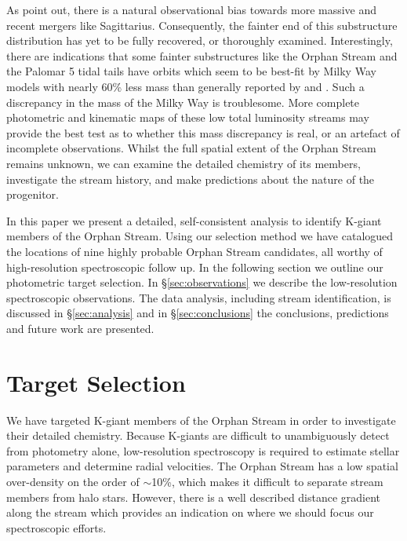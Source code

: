 \documentclass[10pt,apjl]{emulateapj}
\begin{document}
As \citet{Sales_et-al_2008} point out, there is a natural observational bias towards more massive and recent mergers like Sagittarius. Consequently, the fainter end of this substructure distribution has yet to be fully recovered, or thoroughly examined. Interestingly, there are indications that  some fainter substructures like the Orphan Stream and the Palomar 5 tidal tails \citep{Odenkirchen_et-al_2009} have orbits which seem to be best-fit by Milky Way models with nearly 60\% less mass \citep{Newberg_et-al_2010} than generally reported by \citet{Xue_et-al_2008} and \citet{Koposov_et-al_2010}. Such a discrepancy in the mass of the Milky Way is troublesome. More complete photometric and kinematic maps of these low total luminosity streams may provide the best test as to whether this mass discrepancy is real, or an artefact of incomplete observations. Whilst the full spatial extent of the Orphan Stream remains unknown, we can examine the detailed chemistry of its members, investigate the stream history, and make predictions about the nature of the progenitor.

In this paper we present a detailed, self-consistent analysis to identify K-giant members of the Orphan Stream. Using our selection method we have catalogued the locations of nine highly probable Orphan Stream candidates, all worthy of high-resolution spectroscopic follow up. In the following section we outline our photometric target selection. In \S\ref{sec:observations} we describe the low-resolution spectroscopic observations. The data analysis, including stream identification, is discussed in \S\ref{sec:analysis} and in \S\ref{sec:conclusions} the conclusions, predictions and future work are presented.


\section{Target Selection}
\label{sec:target-selection}

We have targeted K-giant members of the Orphan Stream in order to investigate their detailed chemistry. Because K-giants are difficult to unambiguously detect from photometry alone, low-resolution spectroscopy is required to estimate stellar parameters and determine radial velocities. The Orphan Stream has a low spatial over-density on the order of $\sim$10\%, which makes it difficult to separate stream members from halo stars. However, there is a well described distance gradient along the stream \citep{Belokurov_et-al_2007, Newberg_et-al_2010} which provides an indication on where we should focus our spectroscopic efforts.
\end{document}
